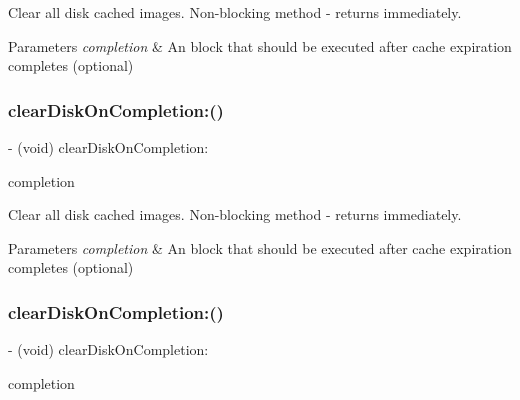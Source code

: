 Clear all disk cached images. Non-\/blocking method -\/ returns immediately. 
\begin{DoxyParams}{Parameters}
{\em completion} & An block that should be executed after cache expiration completes (optional) \\
\hline
\end{DoxyParams}
\mbox{\label{interface_s_d_image_cache_ab936a83a1b711209d30f9051cc3658cc}} 
\subsubsection{\texorpdfstring{clear\+Disk\+On\+Completion\+:()}{clearDiskOnCompletion:()}\hspace{0.1cm}{\footnotesize\ttfamily [2/3]}}
{\footnotesize\ttfamily -\/ (void) clear\+Disk\+On\+Completion\+: \begin{DoxyParamCaption}\item[{(S\+D\+Web\+Image\+No\+Params\+Block)}]{completion }\end{DoxyParamCaption}}

Clear all disk cached images. Non-\/blocking method -\/ returns immediately. 
\begin{DoxyParams}{Parameters}
{\em completion} & An block that should be executed after cache expiration completes (optional) \\
\hline
\end{DoxyParams}
\mbox{\label{interface_s_d_image_cache_ab936a83a1b711209d30f9051cc3658cc}} 
\subsubsection{\texorpdfstring{clear\+Disk\+On\+Completion\+:()}{clearDiskOnCompletion:()}\hspace{0.1cm}{\footnotesize\ttfamily [3/3]}}
{\footnotesize\ttfamily -\/ (void) clear\+Disk\+On\+Completion\+: \begin{DoxyParamCaption}\item[{(S\+D\+Web\+Image\+No\+Params\+Block)}]{completion }\end{DoxyParamCaption}}

